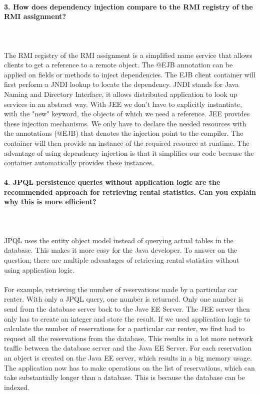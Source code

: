 \documentclass{ds-report}
\begin{document}
	\paragraph{3. How does dependency injection compare to the RMI registry of the RMI assignment?} \mbox{}\\\\
The RMI registry of the RMI assignment is a simplified name service that allows clients to get a reference to a remote object. The @EJB annotation can be applied on fields or methods to inject dependencies. The EJB client container will first perform a JNDI lookup to locate the dependency. JNDI stands for Java Naming and Directory Interface, it allows distributed application to look up services in an abstract way.
With JEE we don't have to explicitly instantiate, with the "new" keyword, the objects of which we need a reference. JEE provides these injection mechanisms. We only have to declare the needed resources with the annotations (@EJB) that denotes the injection point to the compiler. The container will then provide an instance of the required resource at runtime. The advantage of using dependency injection is that it simplifies our code because the container automatically provides these instances.



	\paragraph{4. JPQL persistence queries without application logic are the recommended approach for retrieving rental statistics. Can you explain why this is more efficient?} \mbox{}\\\\
JPQL uses the entity object model instead of querying actual tables in the database. This makes it more easy for the Java developer. To answer on the question; there are multiple advantages of retrieving rental statistics without using application logic.\\\\
For example, retrieving the number of reservations made by a particular car renter. With only a JPQL query, one number is returned. Only one number is send from the database server back to the Jave EE Server. The JEE server then only has to create an integer and store the result. If we used application logic to calculate the number of reservations for a particular car renter, we first had to request all the reservations from the database. This results in a lot more network traffic between the database server and the Java EE Server. For each reservation an object is created on the Java EE server, which results in a big memory usage. The application now has to make operations on the list of reservations, which can take substantially longer than a database. This is because the database can be indexed.
\end{document}
